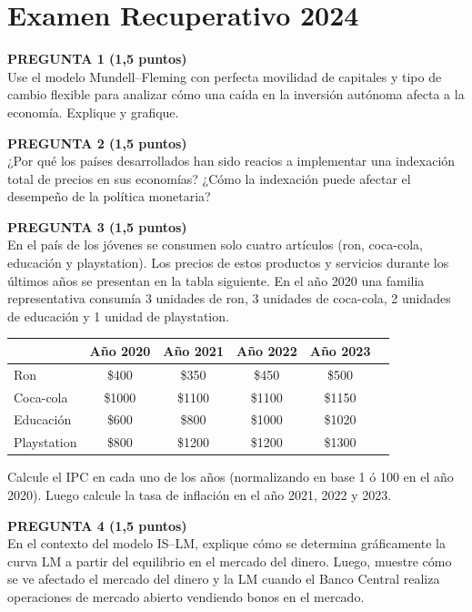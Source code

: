 \documentclass[11pt,addpoints]{article}
\begin{document}

\section*{Examen Recuperativo 2024}


\textbf{PREGUNTA 1 (1,5 puntos)}\\[0.2cm]
Use el modelo Mundell--Fleming con perfecta movilidad de capitales y tipo de cambio flexible para analizar cómo una caída en la inversión autónoma afecta a la economía. Explique y grafique.

\vspace{0.4cm}

\textbf{PREGUNTA 2 (1,5 puntos)}\\[0.2cm]
¿Por qué los países desarrollados han sido reacios a implementar una indexación total de precios en sus economías? ¿Cómo la indexación puede afectar el desempeño de la política monetaria?

\vspace{0.4cm}

\textbf{PREGUNTA 3 (1,5 puntos)}\\[0.2cm]
En el país de los jóvenes se consumen solo cuatro artículos (ron, coca-cola, educación y playstation). Los precios de estos productos y servicios durante los últimos años se presentan en la tabla siguiente. En el año 2020 una familia representativa consumía 3 unidades de ron, 3 unidades de coca-cola, 2 unidades de educación y 1 unidad de playstation.

\begin{center}
\begin{tabular}{lccccc}
\toprule
            & Año 2020 & Año 2021 & Año 2022 & Año 2023 \\
\midrule
Ron         & \$400  & \$350  & \$450  & \$500  \\
Coca-cola   & \$1000 & \$1100 & \$1100 & \$1150 \\
Educación   & \$600  & \$800  & \$1000 & \$1020 \\
Playstation & \$800  & \$1200 & \$1200 & \$1300 \\
\bottomrule
\end{tabular}
\end{center}

Calcule el IPC en cada uno de los años (normalizando en base 1 ó 100 en el año 2020). Luego calcule la tasa de inflación en el año 2021, 2022 y 2023.

\vspace{0.4cm}

\textbf{PREGUNTA 4 (1,5 puntos)}\\[0.2cm]
En el contexto del modelo IS--LM, explique cómo se determina gráficamente la curva LM a partir del equilibrio en el mercado del dinero. Luego, muestre cómo se ve afectado el mercado del dinero y la LM cuando el Banco Central realiza operaciones de mercado abierto vendiendo bonos en el mercado.
\end{document}
